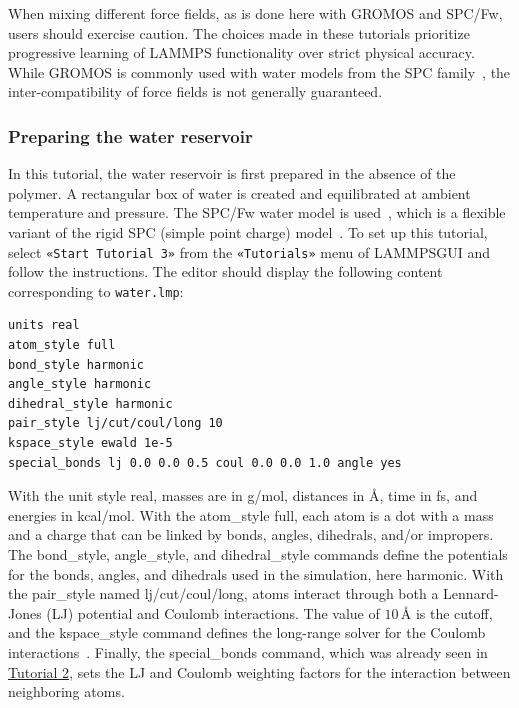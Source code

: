 \documentclass[9pt,tutorial]{livecoms}
\newcommand{\lmpcmd}[1]{\colorbox{listing}{\textcolor{command}{\small{#1}}}} %
\newcommand{\flecmd}[1]{\textcolor{command}{\texttt{#1}}} %
\newcommand{\guicmd}[1]{\textcolor{command}{\texttt{«#1»}}} %
\newcommand{\lammpsgui}{\textsf{LAMMPS\textendash GUI}}
\begin{document}
\begin{note}
{\color{blue}When mixing different force fields, as is done here with GROMOS
and SPC/Fw, users should exercise caution.  The choices made in these tutorials
prioritize progressive learning of LAMMPS functionality
over strict physical accuracy.  While GROMOS is commonly used with water
models from the SPC family~\cite{oostenbrink2004biomolecular},
the inter-compatibility of force fields is not generally guaranteed.}
\end{note}

\subsubsection{Preparing the water reservoir}

In this tutorial, the water reservoir is first prepared in the absence of the polymer.
A rectangular box of water is created and equilibrated at ambient temperature and
pressure.  The SPC/Fw water model is used~\cite{wu2006flexible}, which is
a flexible variant of the rigid SPC (simple point charge) model~\cite{berendsen1981interaction}.
To set up this tutorial, select \guicmd{Start Tutorial 3} from the
\guicmd{Tutorials} menu of \lammpsgui{} and follow the instructions.
The editor should display the following content corresponding to \flecmd{water.lmp}:
\begin{lstlisting}
units real
atom_style full
bond_style harmonic
angle_style harmonic
dihedral_style harmonic
pair_style lj/cut/coul/long 10
kspace_style ewald 1e-5
special_bonds lj 0.0 0.0 0.5 coul 0.0 0.0 1.0 angle yes
\end{lstlisting}
With the unit style \lmpcmd{real}, masses are in g/mol, distances in Å,
time in fs, and energies in kcal/mol.  With the \lmpcmd{atom\_style
  full}, each atom is a dot with a mass and a charge that can be linked
by bonds, angles, dihedrals, and/or impropers.  The
\lmpcmd{bond\_style}, \lmpcmd{angle\_style}, and
\lmpcmd{dihedral\_style} commands define the potentials for the bonds,
angles, and dihedrals used in the simulation, here \lmpcmd{harmonic}.
With the \lmpcmd{pair\_style} named \lmpcmd{lj/cut/coul/long}, atoms
interact through both a Lennard-Jones (LJ) potential and Coulomb
interactions.  The value of $10\,\text{\AA{}}$ is the cutoff, and the
\lmpcmd{kspace\_style} command defines the long-range solver for the Coulomb
interactions~\cite{ewald1921berechnung}.  Finally, the
\lmpcmd{special\_bonds} command, which was already seen in
\hyperref[carbon-nanotube-label]{Tutorial 2}, sets the LJ and Coulomb
weighting factors for the interaction between neighboring atoms.
\end{document}
